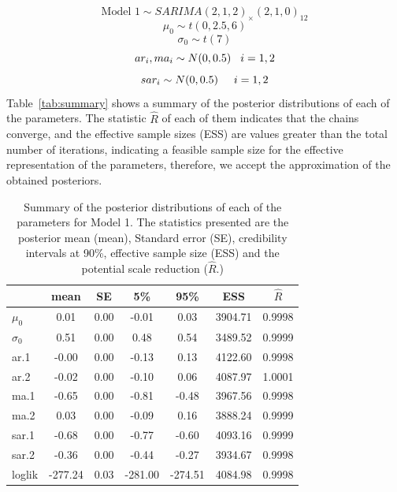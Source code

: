 $$\text{Model 1} \sim SARIMA(2,1,2)_\times(2,1,0)_{12}$$
$$ \mu_0 \sim t(0,2.5,6)$$
$$ \sigma_0 \sim t(7)$$
$$ ar_i, ma_i \sim N(0,0.5) \hspace{0.3cm} i=1,2$$
$$sar_i \sim N(0,0.5) \hspace{0.5cm} i=1,2$$
Table~\ref{tab:summary} shows a summary of the posterior distributions of each of the parameters. The statistic $\hat{R}$ of each of them indicates that the chains converge, and the effective sample sizes (ESS) are values greater than the total number of iterations, indicating a feasible sample size for the effective representation of the parameters, therefore, we accept the approximation of the obtained posteriors.
%
\begin{table}[!ht]
	\centering
	\begin{tabular}{lcccccc}
		\hline
		& mean & SE & 5\% & 95\% & ESS & $\hat{R}$ \\ 
		\hline
		$\mu_0$ & 0.01 & 0.00 & -0.01 & 0.03 & 3904.71 & 0.9998 \\ 
		$\sigma_0$ & 0.51 & 0.00 & 0.48 & 0.54 & 3489.52 & 0.9999 \\ 
		ar.1 & -0.00 & 0.00 & -0.13 & 0.13 & 4122.60 & 0.9998 \\ 
		ar.2 & -0.02 & 0.00 & -0.10 & 0.06 & 4087.97 & 1.0001 \\ 
		ma.1 & -0.65 & 0.00 & -0.81 & -0.48 & 3967.56 & 0.9998 \\ 
		ma.2 & 0.03 & 0.00 & -0.09 & 0.16 & 3888.24 & 0.9999 \\ 
		sar.1 & -0.68 & 0.00 & -0.77 & -0.60 & 4093.16 & 0.9999 \\ 
		sar.2 & -0.36 & 0.00 & -0.44 & -0.27 & 3934.67 & 0.9998 \\ 
		loglik & -277.24 & 0.03 & -281.00 & -274.51 & 4084.98 & 0.9998 \\ 
		\hline
	\end{tabular}
	\smallskip 
	\caption{Summary of the posterior distributions of each of the parameters for Model 1. The statistics presented are the posterior mean (mean), Standard error (SE), credibility intervals at 90\%, effective sample size (ESS) and the potential scale reduction ($\hat{R}$.) }
	\label{tab:resumen}
\end{table}
%

